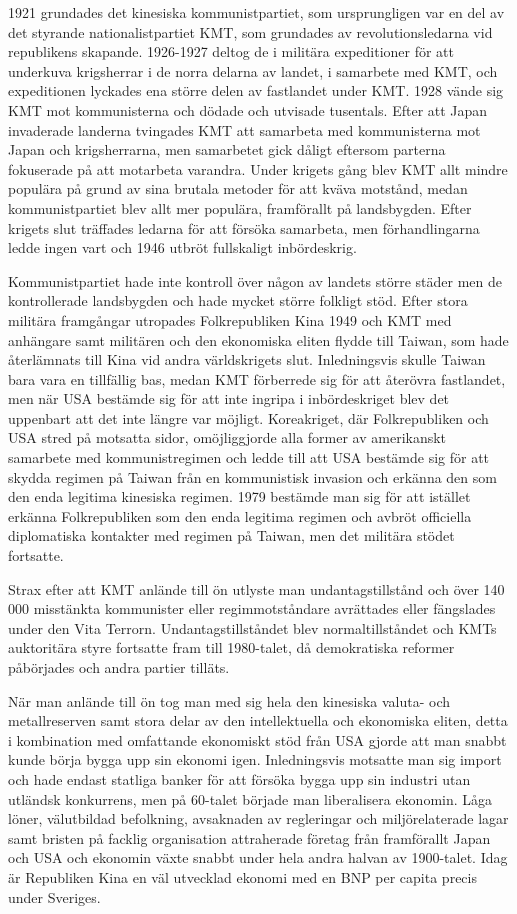 \documentclass[a4paper,10pt]{article}
\begin{document}
1921 grundades det kinesiska kommunistpartiet, som ursprungligen var en del av det styrande nationalistpartiet KMT, som grundades av revolutionsledarna vid republikens skapande. 1926-1927 deltog de i militära expeditioner för att underkuva krigsherrar i de norra delarna av landet, i samarbete med KMT, och expeditionen lyckades ena större delen av fastlandet under KMT. 1928 vände sig KMT mot kommunisterna och dödade och utvisade tusentals. Efter att Japan invaderade landerna tvingades KMT att samarbeta med kommunisterna mot Japan och krigsherrarna, men samarbetet gick dåligt eftersom parterna fokuserade på att motarbeta varandra. Under krigets gång blev KMT allt mindre populära på grund av sina brutala metoder för att kväva motstånd, medan kommunistpartiet blev allt mer populära, framförallt på landsbygden. Efter krigets slut träffades ledarna för att försöka samarbeta, men förhandlingarna ledde ingen vart och 1946 utbröt fullskaligt inbördeskrig.

Kommunistpartiet hade inte kontroll över någon av landets större städer men de kontrollerade landsbygden och hade mycket större folkligt stöd. Efter stora militära framgångar utropades Folkrepubliken Kina 1949 och KMT med anhängare samt militären och den ekonomiska eliten flydde till Taiwan, som hade återlämnats till Kina vid andra världskrigets slut. Inledningsvis skulle Taiwan bara vara en tillfällig bas, medan KMT förberrede sig för att återövra fastlandet, men när USA bestämde sig för att inte ingripa i inbördeskriget blev det uppenbart att det inte längre var möjligt. Koreakriget, där Folkrepubliken och USA stred på motsatta sidor, omöjliggjorde alla former av amerikanskt samarbete med kommunistregimen och ledde till att USA bestämde sig för att skydda regimen på Taiwan från en kommunistisk invasion och erkänna den som den enda legitima kinesiska regimen. 1979 bestämde man sig för att istället erkänna Folkrepubliken som den enda legitima regimen och avbröt officiella diplomatiska kontakter med regimen på Taiwan, men det militära stödet fortsatte.

Strax efter att KMT anlände till ön utlyste man undantagstillstånd och över 140 000 misstänkta kommunister eller regimmotståndare avrättades eller fängslades under den Vita Terrorn. Undantagstillståndet blev normaltillståndet och KMTs auktoritära styre fortsatte fram till 1980-talet, då demokratiska reformer påbörjades och andra partier tilläts.

När man anlände till ön tog man med sig hela den kinesiska valuta- och metallreserven samt stora delar av den intellektuella och ekonomiska eliten, detta i kombination med omfattande ekonomiskt stöd från USA gjorde att man snabbt kunde börja bygga upp sin ekonomi igen. Inledningsvis motsatte man sig import och hade endast statliga banker för att försöka bygga upp sin industri utan utländsk konkurrens, men på 60-talet började man liberalisera ekonomin. Låga löner, välutbildad befolkning, avsaknaden av regleringar och miljörelaterade lagar samt bristen på facklig organisation attraherade företag från framförallt Japan och USA och ekonomin växte snabbt under hela andra halvan av 1900-talet. Idag är Republiken Kina en väl utvecklad ekonomi med en BNP per capita precis under Sveriges.
\end{document}
